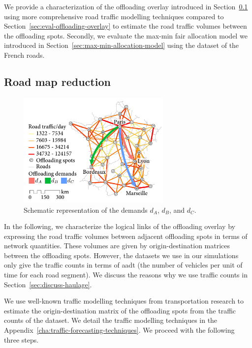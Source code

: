 We provide a characterization of the offloading overlay introduced in Section~\ref{sec:road-map-reduction-throughput} using more comprehensive road traffic modelling techniques compared to Section~\ref{sec:eval-offloading-overlay} to estimate the road traffic volumes between the offloading spots. Secondly, we evaluate the max-min fair allocation model we introduced in Section~\ref{sec:max-min-allocation-model} using the dataset of the French roads.

\subsection{Road map reduction} 
\label{sec:road-map-reduction-throughput}

\begin{figure}
    \vspace{-15pt}
    \centering
    \includegraphics[width=7.5cm]{figures/France-overlay-haulage.pdf}
    \caption{Schematic representation of the demands $d_A$, $d_B$, and $d_C$.}
    \label{fig:france-demand-allocation-haulage}
\end{figure}
In the following, we characterize the logical links of the offloading overlay by expressing the road traffic volumes between adjacent offloading spots in terms of network quantities. These volumes are given by origin-destination matrices between the offloading spots. However, the datasets we use in our simulations only give the traffic counts in terms of \acrshort{aadt} (\ie the number of vehicles per unit of time for each road segment). We discuss the reasons why we use traffic counts in Section~\ref{sec:discuss-haulage}.

We use well-known traffic modelling techniques from transportation research to estimate the origin-destination matrix of the offloading spots from the traffic counts of the dataset. We detail the traffic modelling techniques in the Appendix~\ref{cha:traffic-forecasting-techniques}. We proceed with the following three steps.

